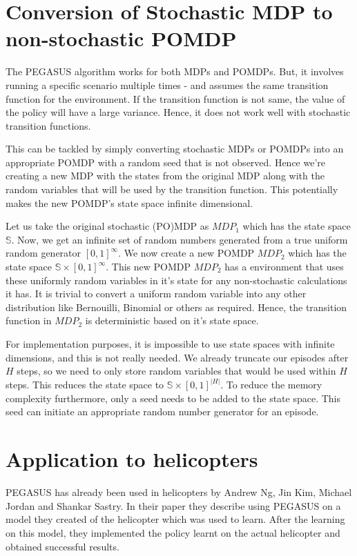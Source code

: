 \documentclass[hidelinks,BTech]{iitmdiss}
\begin{document}
\section{Conversion of Stochastic MDP to non-stochastic POMDP}

The PEGASUS algorithm works for both MDPs and POMDPs. But, it involves running a specific scenario multiple times - and assumes the same transition function for the environment. If the transition function is not same, the value of the policy will have a large variance. Hence, it does not work well with stochastic transition functions.

This can be tackled by simply converting stochastic MDPs or POMDPs into an appropriate POMDP with a random seed that is not observed. Hence we're creating a new MDP with the states from the original MDP along with the random variables that will be used by the transition function. This potentially makes the new POMDP's state space infinite dimensional.

Let us take the original stochastic (PO)MDP as $MDP_{1}$ which has the state space $\mathbb{S}$. Now, we get an infinite set of random numbers generated from a true uniform random generator $[0,1]^{\infty}$. We now create a new POMDP $MDP_{2}$ which has the state space $\mathbb{S} \times [0,1]^{\infty}$. This new POMDP $MDP_{2}$ has a environment that uses these uniformly random variables in it's state for any non-stochastic calculations it has. It is trivial to convert a uniform random variable into any other distribution like Bernouilli, Binomial or others as required. Hence, the transition function in $MDP_{2}$ is deterministic based on it's state space.

For implementation purposes, it is impossible to use state spaces with infinite dimensions, and this is not really needed. We already truncate our episodes after $H$ steps, so we need to only store random variables that would be used within $H$ steps. This reduces the state space to $\mathbb{S} \times [0,1]^{|H|}$. To reduce the memory complexity furthermore, only a seed needs to be added to the state space. This seed can initiate an appropriate random number generator for an episode.

\section{Application to helicopters}

PEGASUS has already been used in helicopters \cite{HelicopterPegasus}  by Andrew Ng, Jin Kim, Michael Jordan and Shankar Sastry. In their paper they describe using PEGASUS on a model they created of the helicopter which was used to learn. After the learning on this model, they implemented the policy learnt on the actual helicopter and obtained successful results.
\end{document}
